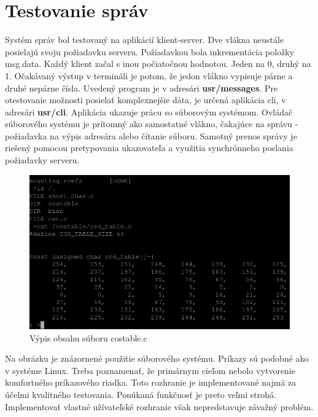\section {Testovanie správ}

Systém správ bol testovaný na aplikácií klient-server. Dve vlákna neustále posielajú svoju požiadavku serveru. Požiadavkou bola inkrementácia položky msg.data. Každý klient začal s inou počiatočnou hodnotou. Jeden na 0, druhý na 1. Očakávaný výstup v termináli je potom, že jedon vlákno vypisuje párne a druhé nepárne čísla. Uvedený program je v adresári \textbf{usr/messages}. Pre otestovanie možnosti posielať komplexnejšie dáta, je určená aplikácia cli, v adresári \textbf{usr/cli}. Aplikácia ukazuje prácu so súborovým systémom. Ovládač súborového systému je prítomný ako samostatné vlákno, čakajúce na správu - požiadavka na výpis adresára alebo čítanie súboru. Samotný prenos správy je riešený pomocou pretypovania ukazovateľa a využitia synchrónneho poslania požiadavky serveru.
\newpage
\begin{figure}[ht]
\begin{center}
\begin{minipage}{1.1\linewidth}
\begin{center}
\includegraphics[width=.7\textwidth]{images/romfs_.png}
\caption{Výpis obsahu súboru costable.c}
\label{obr2}
\end{center}
\end{minipage}
\end{center}
\end{figure}

Na obrázku je znázornené použitie súborového systému. Príkazy sú podobné ako v systéme Linux. Treba poznamenať, že primárnym cieľom nebolo vytvorenie komfortného príkazového riadka. Toto rozhranie je implementované najmä za účelmi kvalitného testovania. Ponúkaná funkčnosť je preto veľmi strohá. Implementovať vlastné užívateľské rozhranie však nepredstavuje závažný problém.


